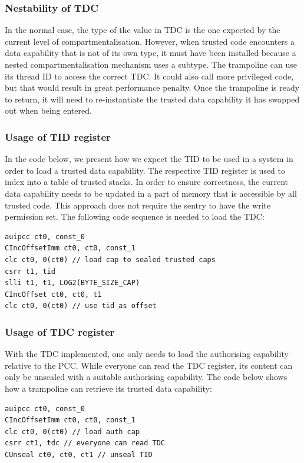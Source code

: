 \subsubsection{Nestability of TDC}

In the normal case, the type of the value in TDC is the one expected by the current level of compartmentalisation.
However, when trusted code encounters a data capability that is not of its own type, it must have been installed because a nested compartmentalisation mechanism uses a subtype.
The trampoline can use its thread ID to access the correct TDC.
It could also call more privileged code, but that would result in great performance penalty.
Once the trampoline is ready to return, it will need to re-instantiate the trusted data capability it has swapped out when being entered.

\subsubsection{Usage of TID register}

In the code below, we present how we expect the TID to be used in a system in order to load a trusted data capability.
The respective TID register is used to index into a table of trusted stacks.
In order to ensure correctness, the current data capability needs to be updated in a part of memory that is accessible by all trusted code.
This approach does not require the sentry to have the write permission set.
The following code sequence is needed to load the TDC:

\begin{lstlisting}[label=tid_load_tdc]
auipcc ct0, const_0
CIncOffsetImm ct0, ct0, const_1
clc ct0, 0(ct0) // load cap to sealed trusted caps
csrr t1, tid
slli t1, t1, LOG2(BYTE_SIZE_CAP)
CIncOffset ct0, ct0, t1
clc ct0, 0(ct0) // use tid as offset
\end{lstlisting}

\subsubsection{Usage of TDC register}

With the TDC implemented, one only needs to load the authorising capability relative to the PCC.
While everyone can read the TDC register, its content can only be unsealed with a suitable authorising capability.
The code below shows how a trampoline can retrieve its trusted data capability:

\begin{lstlisting}[label=tdc_load_tdc]
auipcc ct0, const_0
CIncOffsetImm ct0, ct0, const_1
clc ct0, 0(ct0) // load auth cap
csrr ct1, tdc // everyone can read TDC
CUnseal ct0, ct0, ct1 // unseal TID
\end{lstlisting}

